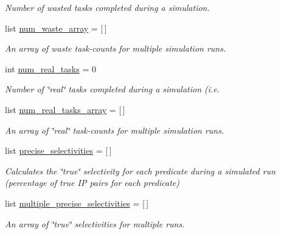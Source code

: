 \begin{DoxyCompactItemize}
\begin{DoxyCompactList}\small\item\em Number of wasted tasks completed during a simulation. \end{DoxyCompactList}\item 
list \hyperlink{classdynamicfilterapp_1_1test__simulations_1_1_simulation_test_a828f23437ee523a85f868b2f4415ec6f}{num\+\_\+waste\+\_\+array} = \mbox{[}$\,$\mbox{]}
\begin{DoxyCompactList}\small\item\em An array of waste task-\/counts for multiple simulation runs. \end{DoxyCompactList}\item 
int \hyperlink{classdynamicfilterapp_1_1test__simulations_1_1_simulation_test_a61300ee4fb9cf4d5350f644139128cb6}{num\+\_\+real\+\_\+tasks} = 0
\begin{DoxyCompactList}\small\item\em Number of \char`\"{}real\char`\"{} tasks completed during a simulation (i.\+e. \end{DoxyCompactList}\item 
list \hyperlink{classdynamicfilterapp_1_1test__simulations_1_1_simulation_test_a3fb16b395d9b79d1978cac8a76b81ea6}{num\+\_\+real\+\_\+tasks\+\_\+array} = \mbox{[}$\,$\mbox{]}
\begin{DoxyCompactList}\small\item\em An array of \char`\"{}real\char`\"{} task-\/counts for multiple simulation runs. \end{DoxyCompactList}\item 
list \hyperlink{classdynamicfilterapp_1_1test__simulations_1_1_simulation_test_a8d53be86a7f2509e044464570fd8e640}{precise\+\_\+selectivities} = \mbox{[}$\,$\mbox{]}
\begin{DoxyCompactList}\small\item\em Calculates the \char`\"{}true\char`\"{} selectivity for each predicate during a simulated run (percentage of true IP pairs for each predicate) \end{DoxyCompactList}\item 
list \hyperlink{classdynamicfilterapp_1_1test__simulations_1_1_simulation_test_a0a23d1f7f323366b1269cc0ad9e73fae}{multiple\+\_\+precise\+\_\+selectivities} = \mbox{[}$\,$\mbox{]}
\begin{DoxyCompactList}\small\item\em An array of \char`\"{}true\char`\"{} selectivities for multiple runs. \end{DoxyCompactList}\item 

\end{DoxyCompactItemize}
